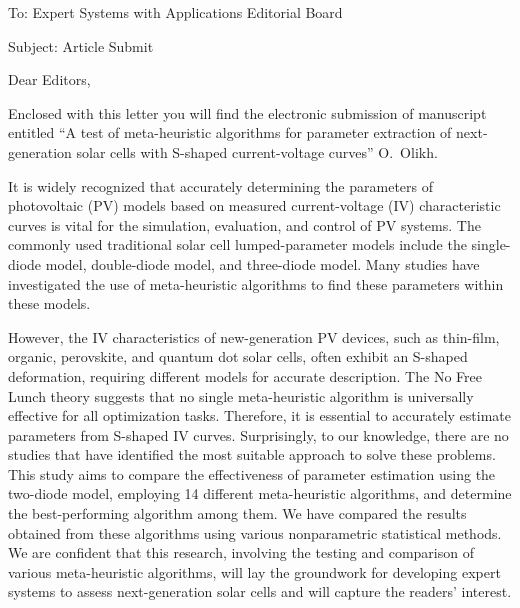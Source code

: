\documentclass[preprint]{elsarticle}
\begin{document}
To:
Expert Systems with Applications Editorial Board


Subject:
Article Submit

\vspace{5mm}
Dear Editors,

\vspace{3mm}
Enclosed with this letter you will find the electronic submission of manuscript entitled
``A test of meta-heuristic algorithms for parameter extraction of next-generation solar cells with S-shaped current-voltage curves'' O.~Olikh.



It is widely recognized that accurately determining the parameters of photovoltaic (PV) models
based on measured current-voltage (IV) characteristic curves is vital for the simulation, evaluation, and control of PV systems.
The commonly used traditional solar cell lumped-parameter models include the single-diode model, double-diode model, and three-diode model.
Many studies have investigated the use of meta-heuristic algorithms to find these parameters within these models.

However, the IV characteristics of new-generation PV devices, such as thin-film, organic, perovskite, and quantum dot solar cells, often exhibit an S-shaped deformation, requiring different models for accurate description.
The No Free Lunch theory suggests that no single meta-heuristic algorithm is universally effective for all optimization tasks.
Therefore, it is essential to accurately estimate parameters from S-shaped IV curves.
Surprisingly, to our knowledge, there are no studies that have identified the most suitable approach to solve these problems.
This study aims to compare the effectiveness of parameter estimation using the two-diode model, employing 14 different meta-heuristic algorithms, and determine the best-performing algorithm among them.
We have compared the results obtained from these algorithms using various nonparametric statistical methods.
We are confident that this research, involving the testing and comparison of various meta-heuristic algorithms, will lay the groundwork for developing expert systems to assess next-generation solar cells and will capture the readers' interest.
\end{document}
